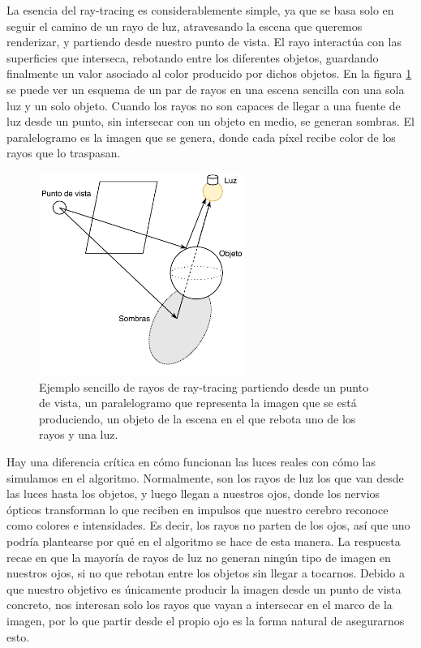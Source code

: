 \documentclass{scrbook}
\begin{document}
La esencia del ray-tracing es considerablemente simple, ya que se basa solo en seguir el camino de un rayo de luz, atravesando la escena que queremos renderizar, y partiendo desde nuestro punto de vista. El rayo interactúa con las superficies que interseca, rebotando entre los diferentes objetos, guardando finalmente un valor asociado al color producido por dichos objetos. En la figura \ref{fig:raytracing} se puede ver un esquema de un par de rayos en una escena sencilla con una sola luz y un solo objeto. Cuando los rayos no son capaces de llegar a una fuente de luz desde un punto, sin intersecar con un objeto en medio, se generan sombras. El paralelogramo es la imagen que se genera, donde cada píxel recibe color de los rayos que lo traspasan.

\begin{figure}[ht]
	\centering
	\includegraphics[width=0.6\textwidth]{raytracing}
	\caption{Ejemplo sencillo de rayos de ray-tracing partiendo desde un punto de vista, un paralelogramo que representa la imagen que se está produciendo, un objeto de la escena en el que rebota uno de los rayos y una luz.}
	\label{fig:raytracing}
\end{figure}

Hay una diferencia crítica en cómo funcionan las luces reales con cómo las simulamos en el algoritmo. Normalmente, son los rayos de luz los que van desde las luces hasta los objetos, y luego llegan a nuestros ojos, donde los nervios ópticos transforman lo que reciben en impulsos que nuestro cerebro reconoce como colores e intensidades. Es decir, los rayos no parten de los ojos, así que uno podría plantearse por qué en el algoritmo se hace de esta manera. La respuesta recae en que la mayoría de rayos de luz no generan ningún tipo de imagen en nuestros ojos, si no que rebotan entre los objetos sin llegar a tocarnos. Debido a que nuestro objetivo es únicamente producir la imagen desde un punto de vista concreto, nos interesan solo los rayos que vayan a intersecar en el marco de la imagen, por lo que partir desde el propio ojo es la forma natural de asegurarnos esto.
\end{document}
